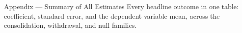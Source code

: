 
\begin{frame}[allowframebreaks]{Appendix --- Summary of All Estimates}
\hypertarget{app:abstract}{}
\footnotesize
Every headline outcome in one table: coefficient, standard error, and the dependent-variable mean, across the consolidation, withdrawal, and null families.
\smallskip
\begin{center}
\scriptsize

\end{center}
\smallskip
\footnotesize \hfill\hyperlink{src:findings}{}
\end{frame}
